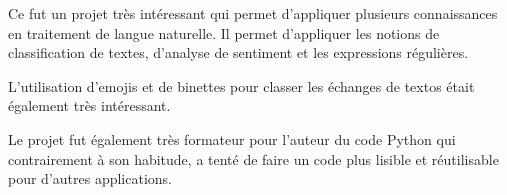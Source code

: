 Ce fut un projet très intéressant qui permet d'appliquer plusieurs connaissances en traitement de langue naturelle. Il permet d'appliquer les notions de classification de textes, d'analyse de sentiment et les expressions régulières.

L'utilisation d'emojis et de binettes pour classer les échanges de textos était également très intéressant.

Le projet fut également très formateur pour l'auteur du code Python qui contrairement à son habitude, a tenté de faire un code plus lisible et réutilisable pour d'autres applications. 